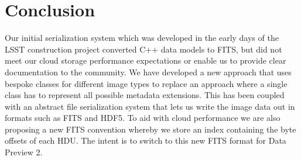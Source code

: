\section{Conclusion}

Our initial serialization system which was developed in the early days of the LSST construction project\cite{2010SPIE.7740E..15A} converted C++ data models to FITS, but did not meet our cloud storage performance expectations or enable us to provide clear documentation to the community.
We have developed a new approach that uses bespoke classes for different image types to replace an approach where a single class has to represent all possible metadata extensions.
This has been coupled with an abstract file serialization system that lets us write the image data out in formats such as FITS and HDF5.
To aid with cloud performance we are also proposing a new FITS convention whereby we store an index containing the byte offsets of each HDU.
The intent is to switch to this new FITS format for Data Preview 2.

